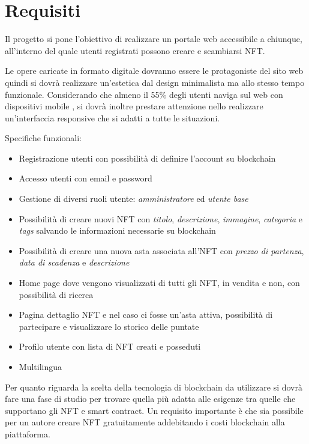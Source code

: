 \section{Requisiti}
Il progetto si pone l'obiettivo di realizzare un portale web accessibile a chiunque, 
all'interno del quale utenti registrati possono creare e scambiarsi NFT.

Le opere caricate in formato digitale dovranno essere le protagoniste del sito web
quindi si dovrà realizzare un'estetica dal design minimalista ma allo stesso tempo funzionale.
Considerando che almeno il 55\% degli utenti naviga sul web con dispositivi mobile \cite{require1}, 
si dovrà inoltre prestare attenzione nello realizzare un'interfaccia responsive che si adatti a tutte le situazioni. 

Specifiche funzionali:
\begin{itemize}
	\item Registrazione utenti con possibilità di definire l'account su blockchain
	\item Accesso utenti con email e password
	\item Gestione di diversi ruoli utente: \textit{amministratore} ed \textit{utente base}
	\item Possibilità di creare nuovi NFT con \textit{titolo}, \textit{descrizione}, \textit{immagine}, \textit{categoria} e \textit{tags} salvando le informazioni necessarie su blockchain
	\item Possibilità di creare una nuova asta associata all'NFT con \textit{prezzo di partenza}, \textit{data di scadenza} e \textit{descrizione}
	\item Home page dove vengono visualizzati di tutti gli NFT, in vendita e non, con possibilità di ricerca
	\item Pagina dettaglio NFT e nel caso ci fosse un'asta attiva, possibilità di partecipare e visualizzare lo storico delle puntate 
	\item Profilo utente con lista di NFT creati e posseduti
	\item Multilingua
\end{itemize}

Per quanto riguarda la scelta della tecnologia di blockchain da utilizzare 
si dovrà fare una fase di studio per trovare quella più adatta alle esigenze 
tra quelle che supportano gli NFT e smart contract. 
Un requisito importante è che sia possibile per un autore creare NFT gratuitamente addebitando i costi blockchain alla piattaforma. 
